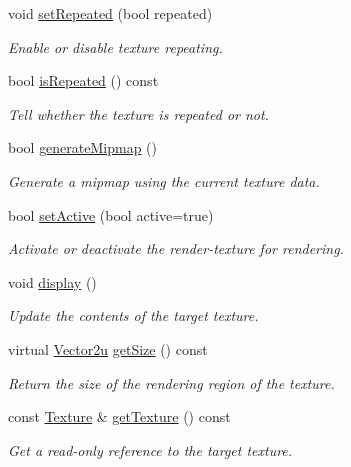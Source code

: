 \begin{DoxyCompactItemize}
void \mbox{\hyperlink{classsf_1_1_render_texture_af8f97b33512bf7d5b6be3da6f65f7365}{set\+Repeated}} (bool repeated)
\begin{DoxyCompactList}\small\item\em Enable or disable texture repeating. \end{DoxyCompactList}\item 
bool \mbox{\hyperlink{classsf_1_1_render_texture_a81c5a453a21c7e78299b062b97dc8c87}{is\+Repeated}} () const
\begin{DoxyCompactList}\small\item\em Tell whether the texture is repeated or not. \end{DoxyCompactList}\item 
bool \mbox{\hyperlink{classsf_1_1_render_texture_a8ca34c8b7e00793c1d3ef4f9a834f8cc}{generate\+Mipmap}} ()
\begin{DoxyCompactList}\small\item\em Generate a mipmap using the current texture data. \end{DoxyCompactList}\item 
bool \mbox{\hyperlink{classsf_1_1_render_texture_a5da95ecdbce615a80bb78399012508cf}{set\+Active}} (bool active=true)
\begin{DoxyCompactList}\small\item\em Activate or deactivate the render-\/texture for rendering. \end{DoxyCompactList}\item 
void \mbox{\hyperlink{classsf_1_1_render_texture_af92886d5faef3916caff9fa9ab32c555}{display}} ()
\begin{DoxyCompactList}\small\item\em Update the contents of the target texture. \end{DoxyCompactList}\item 
virtual \mbox{\hyperlink{classsf_1_1_vector2}{Vector2u}} \mbox{\hyperlink{classsf_1_1_render_texture_a6685315b5c4c25a5dcb75b4280b381ba}{get\+Size}} () const
\begin{DoxyCompactList}\small\item\em Return the size of the rendering region of the texture. \end{DoxyCompactList}\item 
const \mbox{\hyperlink{classsf_1_1_texture}{Texture}} \& \mbox{\hyperlink{classsf_1_1_render_texture_a07ecea85f05932fa02a8279416721bc9}{get\+Texture}} () const
\begin{DoxyCompactList}\small\item\em Get a read-\/only reference to the target texture. \end{DoxyCompactList}\end{DoxyCompactItemize}
